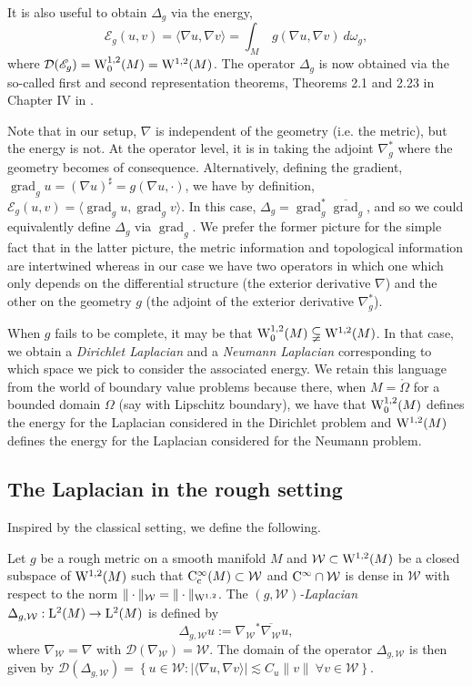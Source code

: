 \documentclass[a4paper, 12pt]{amsart}
\numberwithin{equation}{section}
\renewcommand{\~}{\tilde}
\renewcommand{\-}{\bar}
\newcommand{\8}{\infty}
\newcommand{\cW}{\mathcal{W}}
\DeclareMathOperator{\grad}{grad}
\newcommand{\dbrac}[1]{\left\{#1\right\}}
\newcommand{\modulus}[1]{|#1|}
\newcommand{\set}[1]{\dbrac{#1}}
\newcommand{\dom}{ {\mathcal{D}}}
\newcommand{\script}[1]{\mathscr{#1}}
\newcommand{\close}[1]{\overline{#1}}		%
\newcommand{\norm}[1]{\| #1 \|}			%
\newcommand{\interior}[1]{\mathring{#1}}	%
\newcommand{\adj}[1]{{#1}^\ast}			%
\newcommand{\inprod}[1]{\langle #1 \rangle}	%
\newcommand{\Lp}[2][{}]{{\rm L}^{#2}_{\rm #1}}		%
\newcommand{\Ck}[2][{}]{{\rm C}^{#2}_{\rm #1}}		%
\newcommand{\Sob}[2][{}]{{\rm W}^{#2}_{\rm #1}}		%
\newcommand{\SobH}[2][{}]{{\Sob[#1]{#2,2}}}	%
\newcommand{\sE}{\script{E}}
\begin{document}
It is also useful to obtain $\Delta_g$ via the energy,
$$\sE_g(u,v) = \inprod{\nabla u, \nabla v} = \int_M\ g(\nabla u, \nabla v)\ d\omega_g,$$
where $\dom(\sE_g) = \SobH[0]{1}(M) = \SobH{1}(M)$.
The operator $\Delta_g$ is now obtained via the so-called first and second representation 
theorems, Theorems 2.1 and 2.23 in Chapter IV  in \cite{Kato}.
 
Note that in our setup, $\nabla$ is independent of the geometry (i.e. the metric), but the energy is not. At the operator level, it is in taking the adjoint $\adj{\nabla}_g$ where the geometry becomes of consequence. Alternatively, defining the gradient, $\grad_g u =  (\nabla u)^\sharp = g(\nabla u, \cdot)$, we have by definition, $\sE_g(u,v) = \inprod{\grad_g u, \grad_g v}$. In this case, $\Delta_g = \adj{\grad}_g \close{\grad}_g$, and so we could equivalently define \(\Delta_g\) via \(\grad_g\). We prefer the former picture for the simple fact that in the latter picture, the metric information and topological information are intertwined whereas in our case we have two operators in which one which only depends on the differential structure (the exterior derivative $\nabla$) and the other on the geometry $g$ (the adjoint of the exterior derivative $\nabla^\ast_g$).

When $g$ fails to be complete, it may be that  
$\SobH[0]{1}(M) \subsetneqq  \SobH{1}(M)$.
In that case, we obtain a \emph{Dirichlet Laplacian} and  a \emph{Neumann 
Laplacian} corresponding to which space we pick 
to consider the associated energy.
We retain this language from the world of boundary 
value problems because there, when $M = \interior\Omega$
for a bounded domain $\Omega$ (say with Lipschitz boundary), we have that
$\SobH[0]{1}(M)$ defines the energy for
the Laplacian considered in the Dirichlet problem
and $\SobH{1}(M)$ defines the energy 
for the Laplacian considered for the Neumann problem.

\subsection{The Laplacian in the rough setting}
Inspired by the classical setting, we define
the following.
 
\begin{defn}[$(g,\cW)$-Laplacian]
Let \(g\) be a rough metric on a smooth manifold \(M\)
and $\cW \subset \SobH{1}(M)$ be a closed subspace
of $\SobH{1}(M)$ such that $\Ck[c]{\infty}(M) \subset \cW$
and $\Ck{\infty} \cap \cW$ is dense in $\cW$ with respect to the norm $\norm{\cdot}_{\cW} = \norm{\cdot}_{\SobH{1}}$. The \emph{$(g,\cW)$-Laplacian}
\(\Delta_{g,\cW} : \Lp{2}(M) \to \Lp{2}(M)\) is defined by
\[
\Delta_{g,\cW} u := \adj{\nabla_{\cW}} \close{ \nabla_{\cW}} u,
\]
where  $\nabla_{\cW} = \nabla$ with $\dom(\nabla_{\cW}) = \cW$. 
The domain of the operator $\Delta_{g,\cW}$ is then given by
$\dom(\Delta_{g,\cW}) = \set{u \in \cW: \modulus{\inprod{\nabla u, \nabla v}} \lesssim C_u \norm{v}\ \forall v \in \cW}.$
\end{defn}
\end{document}
